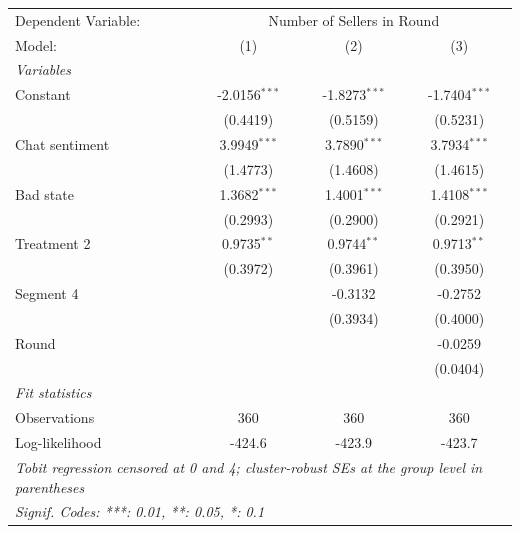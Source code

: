 
\begingroup
\centering
\scriptsize
\begin{tabular}{lccc}
   \tabularnewline \midrule \midrule
   Dependent Variable: & \multicolumn{3}{c}{Number of Sellers in Round}\\
   Model:               & (1)  & (2)  & (3)\\
   \midrule
   \emph{Variables}\\
   Constant                  & -2.0156$^{***}$ & -1.8273$^{***}$ & -1.7404$^{***}$\\
                             & (0.4419) & (0.5159) & (0.5231)\\
   Chat sentiment            & 3.9949$^{***}$ & 3.7890$^{***}$ & 3.7934$^{***}$\\
                             & (1.4773) & (1.4608) & (1.4615)\\
   Bad state                 & 1.3682$^{***}$ & 1.4001$^{***}$ & 1.4108$^{***}$\\
                             & (0.2993) & (0.2900) & (0.2921)\\
   Treatment 2               & 0.9735$^{**}$ & 0.9744$^{**}$ & 0.9713$^{**}$\\
                             & (0.3972) & (0.3961) & (0.3950)\\
   Segment 4                 &  & -0.3132 & -0.2752\\
                             &  & (0.3934) & (0.4000)\\
   Round                     &  &  & -0.0259\\
                             &  &  & (0.0404)\\
   \midrule
   \emph{Fit statistics}\\
   Observations              & 360 & 360 & 360\\
   Log-likelihood            & -424.6 & -423.9 & -423.7\\
   \midrule \midrule
   \multicolumn{4}{l}{\emph{Tobit regression censored at 0 and 4; cluster-robust SEs at the group level in parentheses}}\\
   \multicolumn{4}{l}{\emph{Signif. Codes: ***: 0.01, **: 0.05, *: 0.1}}\\
\end{tabular}
\par\endgroup


